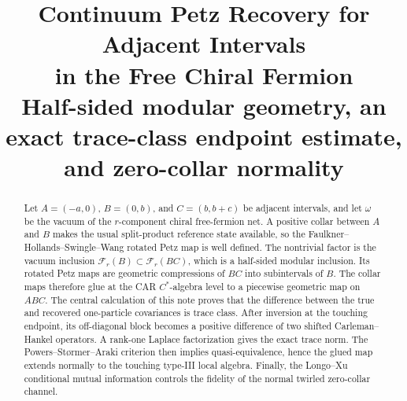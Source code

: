 \documentclass[11pt]{article}
\title{\vspace{-1.55cm}\color{navy}\bfseries
Continuum Petz Recovery for Adjacent Intervals\\[0.25em]
\Large in the Free Chiral Fermion\\[0.5em]
\large Half-sided modular geometry, an exact trace-class endpoint estimate,\\
and zero-collar normality}
\author{}
\date{}
\theoremstyle{accent}
\theoremstyle{definition}
\newcommand{\cF}{\mathcal{F}}
\begin{document}
\maketitle
\vspace{-1.55em}

\begin{abstract}
Let \(A=(-a,0)\), \(B=(0,b)\), and \(C=(b,b+c)\) be adjacent intervals, and let \(\omega\) be the vacuum of the \(r\)-component chiral free-fermion net.  A positive collar between \(A\) and \(B\) makes the usual split-product reference state available, so the Faulkner--Hollands--Swingle--Wang rotated Petz map is well defined.  The nontrivial factor is the vacuum inclusion \(\cF_r(B)\subset\cF_r(BC)\), which is a half-sided modular inclusion.  Its rotated Petz maps are geometric compressions of \(BC\) into subintervals of \(B\).  The collar maps therefore glue at the CAR \(C^*\)-algebra level to a piecewise geometric map on \(ABC\).  The central calculation of this note proves that the difference between the true and recovered one-particle covariances is trace class.  After inversion at the touching endpoint, its off-diagonal block becomes a positive difference of two shifted Carleman--Hankel operators.  A rank-one Laplace factorization gives the exact trace norm.  The Powers--St\o rmer--Araki criterion then implies quasi-equivalence, hence the glued map extends normally to the touching type-III local algebra.  Finally, the Longo--Xu conditional mutual information controls the fidelity of the normal twirled zero-collar channel.
\end{abstract}

\begin{center}
\end{center}
\end{document}
